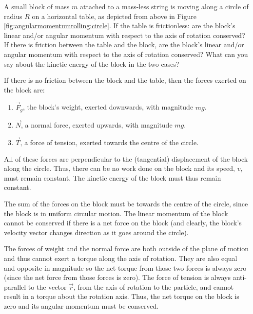 \vspace{-0.35cm}
\begin{example}{
A small block of mass $m$ attached to a mass-less string is moving along a circle of radius $R$ on a horizontal table, as depicted from above in Figure \ref{fig:angularmomentumrolling:circle}. If the table is frictionless: are the block's linear and/or angular momentum with respect to the axis of rotation conserved? If there is friction between the table and the block, are the block's linear and/or angular momentum with respect to the axis of rotation conserved? What can you say about the kinetic energy of the block in the two cases?}

If there is no friction between the block and the table, then the forces exerted on the block are:
\begin{enumerate}
\item $\vec F_g$, the block's weight, exerted downwards, with magnitude $mg$.
\item $\vec N$, a normal force, exerted upwards, with magnitude $mg$.
\item $\vec T$, a force of tension, exerted towards the centre of the circle.
\end{enumerate}
All of these forces are perpendicular to the (tangential) displacement of the block along the circle. Thus, there can be no work done on the block and its speed, $v$, must remain constant. The kinetic energy of the block must thus remain constant.

The sum of the forces on the block must be towards the centre of the circle, since the block is in uniform circular motion. The linear momentum of the block cannot be conserved if there is a net force on the block (and clearly, the block's velocity vector changes direction as it goes around the circle). 

The forces of weight and the normal force are both outside of the plane of motion and thus cannot exert a torque along the axis of rotation. They are also equal and opposite in magnitude so the net torque from those two forces is always zero (since the net force from those forces is zero). The force of tension is always anti-parallel to the vector $\vec r$, from the axis of rotation to the particle, and cannot result in a torque about the rotation axis. Thus, the net torque on the block is zero and its angular momentum must be conserved. 


\end{example}
